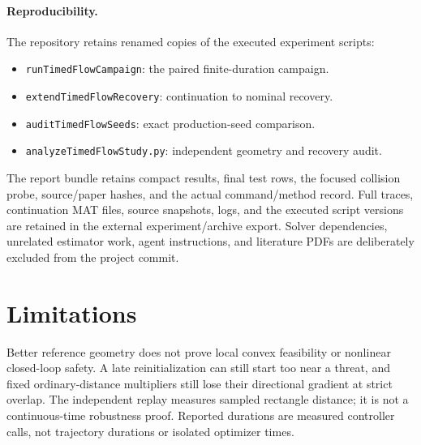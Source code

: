 \documentclass[11pt]{article}
\begin{document}
\paragraph{Reproducibility.} The repository retains renamed copies of the
executed experiment scripts:
\begin{itemize}
\item \texttt{runTimedFlowCampaign}: the paired finite-duration campaign.
\item \texttt{extendTimedFlowRecovery}: continuation to nominal recovery.
\item \texttt{auditTimedFlowSeeds}: exact production-seed comparison.
\item \texttt{analyzeTimedFlowStudy.py}: independent geometry and recovery audit.
\end{itemize}
The report bundle retains compact
results, final test rows, the focused collision probe, source/paper hashes,
and the actual command/method record. Full traces, continuation MAT files,
source snapshots, logs, and the executed script versions are retained in the
external experiment/archive export. Solver dependencies, unrelated estimator
work, agent instructions, and literature PDFs are deliberately excluded from
the project commit.


\section{Limitations}
Better reference geometry does not prove local convex feasibility or nonlinear
closed-loop safety. A late reinitialization can still start too near a threat,
and fixed ordinary-distance multipliers still lose their directional gradient
at strict overlap. The independent replay measures sampled rectangle distance;
it is not a continuous-time robustness proof. Reported durations are measured
controller calls, not trajectory durations or isolated optimizer times.
\end{document}
